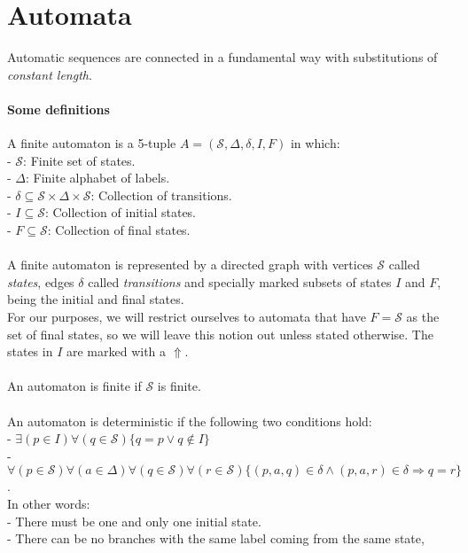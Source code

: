 \documentclass{article}
\begin{document}
\newcommand{\qed}{$\blacksquare$}

\section*{Automata}
Automatic sequences are connected in a fundamental way with substitutions of
\emph{constant length}.

\paragraph{Some definitions}
A finite automaton is a 5-tuple $A = (\mathcal{S}, \Delta, \delta, I, F)$
in which:\\
- $\mathcal{S}$: Finite set of states.\\
- $\Delta$: Finite alphabet of labels.\\
- $\delta \subseteq \mathcal{S} \times \Delta \times \mathcal{S}$:
Collection of transitions.\\
- $I \subseteq \mathcal{S}$: Collection of initial states.\\
- $F \subseteq \mathcal{S}$: Collection of final states.\\
\\
A finite automaton is represented by a directed graph with vertices
$\mathcal{S}$ called \emph{states}, edges $\delta$ called \emph{transitions}
and specially marked subsets of states $I$ and $F$, being the initial and final
states.\\
For our purposes, we will restrict ourselves to automata that have
$F = \mathcal{S}$ as the set of final states, so we will leave this notion
out unless stated otherwise. The states in $I$ are marked with a $\Uparrow$.\\
\\
An automaton is finite if $\mathcal{S}$ is finite.\\
\\
An automaton is deterministic if the following two conditions hold:\\
- $\exists (p \in I) \forall (q  \in \mathcal{S})
\{q = p \lor q \notin I\}$\\
- $\forall (p \in \mathcal{S}) \forall (a \in \Delta)
\forall (q \in \mathcal{S}) \forall (r \in \mathcal{S})
\{(p, a, q) \in \delta \land (p, a, r) \in \delta \Rightarrow q = r\}$.\\
In other words:\\
- There must be one and only one initial state.\\
- There can be no branches with the same label coming from the same state,
\end{document}
